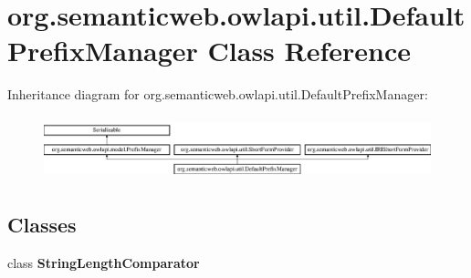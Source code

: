 \hypertarget{classorg_1_1semanticweb_1_1owlapi_1_1util_1_1_default_prefix_manager}{\section{org.\-semanticweb.\-owlapi.\-util.\-Default\-Prefix\-Manager Class Reference}
\label{classorg_1_1semanticweb_1_1owlapi_1_1util_1_1_default_prefix_manager}
}
Inheritance diagram for org.\-semanticweb.\-owlapi.\-util.\-Default\-Prefix\-Manager\-:\begin{figure}[H]
\begin{center}
\leavevmode
\includegraphics[height=1.848185cm]{classorg_1_1semanticweb_1_1owlapi_1_1util_1_1_default_prefix_manager}
\end{center}
\end{figure}
\subsection*{Classes}
\begin{DoxyCompactItemize}
\item 
class {\bfseries String\-Length\-Comparator}
\end{DoxyCompactItemize}
